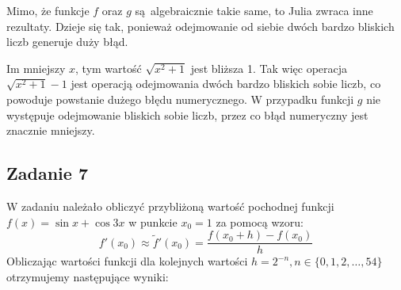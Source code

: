 \documentclass{article}
\begin{document}
\pagebreak

Mimo, że funkcje $f$ oraz $g$ są algebraicznie takie same, to Julia zwraca inne rezultaty. Dzieje się tak, ponieważ odejmowanie od siebie dwóch bardzo bliskich liczb generuje duży błąd.

Im mniejszy $x$, tym wartość $\sqrt{x^2 + 1}$ jest bliższa 1. Tak więc operacja $\sqrt{x^2 + 1} - 1$ jest operacją odejmowania dwóch bardzo bliskich sobie liczb, co powoduje powstanie dużego błędu numerycznego. W przypadku funkcji $g$ nie występuje odejmowanie bliskich sobie liczb, przez co błąd numeryczny jest znacznie mniejszy.

\subsection*{Zadanie 7}
W zadaniu należało obliczyć przybliżoną wartość pochodnej funkcji $f(x) = \sin x + \cos 3x$ w punkcie $x_0 = 1$ za pomocą wzoru:
\[
    f'(x_0) \approx \tilde f'(x_0) = \frac{f(x_0 + h) - f(x_0)}{h}
\]
Obliczając wartości funkcji dla kolejnych wartości $h = 2^{-n}, n \in \{0,1,2,\ldots,54\}$ otrzymujemy następujące wyniki:
\end{document}
